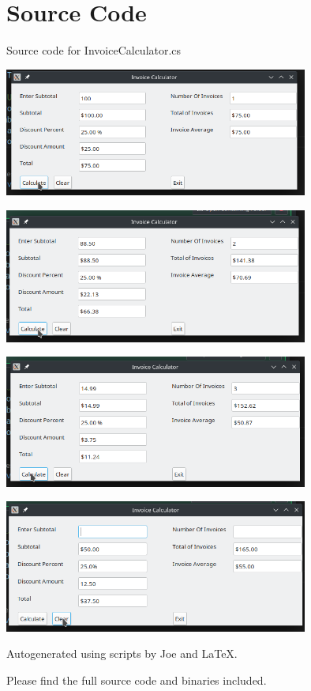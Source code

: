 \documentclass[12pt]{article}
\begin{document}
\maketitle
\pagebreak


\section{Source Code}

Source code for \textsf{InvoiceCalculator.cs}


\newpage



\newpage

\includegraphics[width=10cm]{Ex1}

\includegraphics[width=10cm]{Ex2}

\includegraphics[width=10cm]{Ex3}

\includegraphics[width=10cm]{Ex4}


\newpage

Autogenerated using scripts by Joe and \LaTeX.

Please find the full source code and binaries included.
\end{document}
